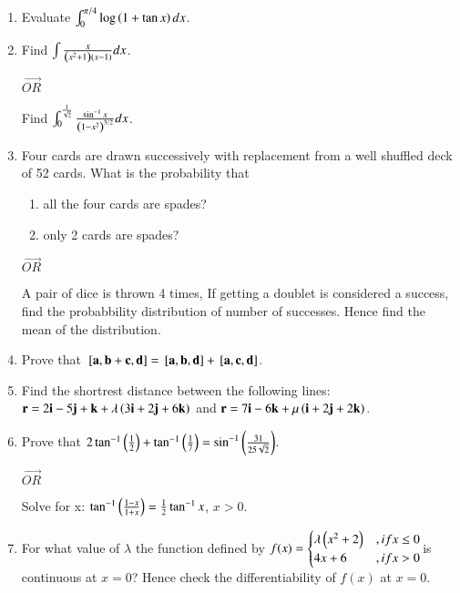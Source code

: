 \documentclass[journal,12pt,twocolumn]{IEEEtran}
\theoremstyle{remark}
\begin{document}
\begin{enumerate}
\item Evaluate $\int_{0}^{{\pi}/4} \log\left(1+\tan{x}\right)dx$. \\
\item Find $\int \frac{x}{\left(x^2+1\right)\left(x-1\right)}dx$.
\begin{center} $\vec{OR}$ \\ \end{center}
Find $\int_{0}^{\frac{1}{\sqrt{2}}} \frac{\sin^{-1}x}{{\left(1-x^2\right)}^{3/2}}dx$.\\
\item Four cards are drawn successively with replacement from a well shuffled deck of 52 cards. What is the probability that
\begin{enumerate}
\item all the four cards are spades?
\item only 2 cards are spades?
\end{enumerate}
\begin{center} $\vec{OR}$ \\ \end{center}
A pair of dice is thrown 4 times, If getting a doublet is considered a success, find the probabbility distribution of number of successes. Hence find the mean of the distribution. \\
\item Prove that ${}\left[\mathbf{a},\mathbf{b}+\mathbf{c},\mathbf{d}\right] = {}\left[\mathbf{a},\mathbf{b},\mathbf{d}\right]+{}\left[\mathbf{a},\mathbf{c},\mathbf{d}\right]$.  \\
\item Find the shortrest distance between the following lines:\\
$\mathbf{r} = 2\mathbf{i}-5\mathbf{j}+\mathbf{k} +\lambda\left(3\mathbf{i}+2\mathbf{j}+6\mathbf{k}\right)$ and $\mathbf{r} = 7\mathbf{i}-6\mathbf{k}+\mu\left(\mathbf{i}+2\mathbf{j}+2\mathbf{k}\right)$. \\
\item Prove that $2\tan^{-1}\left(\frac{1}{2}\right)+\tan^{-1}\left(\frac{1}{7}\right) = \sin^{-1}\left(\frac{31}{25\sqrt{2}}\right)$.
\begin{center} $\vec{OR}$ \\ \end{center}
Solve for x: $\tan^{-1}\left(\frac{1-x}{1+x}\right) = \frac{1}{2}\tan^{-1}x$, $x>0$. \\
\item For what value of $\lambda$ the function defined by $f(x) = \begin{cases} \lambda\left(x^2+2\right)&, if x \leq 0 \\ 4x+6&, if x>0 \end{cases}$is continuous at $x=0$? Hence check the differentiability of $f(x)$ at $x=0$. \\

\end{enumerate}
\end{document}
